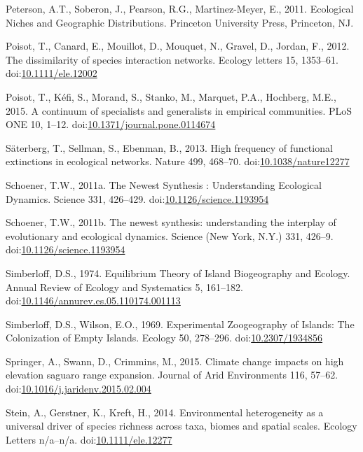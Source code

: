 \hypertarget{ref-Peterson2011}{}
Peterson, A.T., Soberon, J., Pearson, R.G., Martinez-Meyer, E., 2011.
Ecological Niches and Geographic Distributions. Princeton University
Press, Princeton, NJ.

\hypertarget{ref-Poisot2012}{}
Poisot, T., Canard, E., Mouillot, D., Mouquet, N., Gravel, D., Jordan,
F., 2012. The dissimilarity of species interaction networks. Ecology
letters 15, 1353--61.
doi:\href{https://doi.org/10.1111/ele.12002}{10.1111/ele.12002}

\hypertarget{ref-Poisot2015c}{}
Poisot, T., Kéfi, S., Morand, S., Stanko, M., Marquet, P.A., Hochberg,
M.E., 2015. A continuum of specialists and generalists in empirical
communities. PLoS ONE 10, 1--12.
doi:\href{https://doi.org/10.1371/journal.pone.0114674}{10.1371/journal.pone.0114674}

\hypertarget{ref-Saterberg2013}{}
Säterberg, T., Sellman, S., Ebenman, B., 2013. High frequency of
functional extinctions in ecological networks. Nature 499, 468--70.
doi:\href{https://doi.org/10.1038/nature12277}{10.1038/nature12277}

\hypertarget{ref-Schoener2011a}{}
Schoener, T.W., 2011a. The Newest Synthesis : Understanding Ecological
Dynamics. Science 331, 426--429.
doi:\href{https://doi.org/10.1126/science.1193954}{10.1126/science.1193954}

\hypertarget{ref-Schoener2011}{}
Schoener, T.W., 2011b. The newest synthesis: understanding the interplay
of evolutionary and ecological dynamics. Science (New York, N.Y.) 331,
426--9.
doi:\href{https://doi.org/10.1126/science.1193954}{10.1126/science.1193954}

\hypertarget{ref-Simberloff1974a}{}
Simberloff, D.S., 1974. Equilibrium Theory of Island Biogeography and
Ecology. Annual Review of Ecology and Systematics 5, 161--182.
doi:\href{https://doi.org/10.1146/annurev.es.05.110174.001113}{10.1146/annurev.es.05.110174.001113}

\hypertarget{ref-Simberloff2016}{}
Simberloff, D.S., Wilson, E.O., 1969. Experimental Zoogeography of
Islands: The Colonization of Empty Islands. Ecology 50, 278--296.
doi:\href{https://doi.org/10.2307/1934856}{10.2307/1934856}

\hypertarget{ref-Springer2015}{}
Springer, A., Swann, D., Crimmins, M., 2015. Climate change impacts on
high elevation saguaro range expansion. Journal of Arid Environments
116, 57--62.
doi:\href{https://doi.org/10.1016/j.jaridenv.2015.02.004}{10.1016/j.jaridenv.2015.02.004}

\hypertarget{ref-Stein2014}{}
Stein, A., Gerstner, K., Kreft, H., 2014. Environmental heterogeneity as
a universal driver of species richness across taxa, biomes and spatial
scales. Ecology Letters n/a--n/a.
doi:\href{https://doi.org/10.1111/ele.12277}{10.1111/ele.12277}


